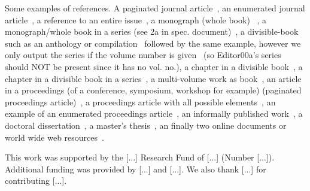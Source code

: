 \documentclass[sigconf, nonacm]{acmart}
\begin{document}
Some examples of references. A paginated journal article~\cite{Abril07}, an enumerated journal article~\cite{Cohen07}, a reference to an entire issue~\cite{JCohen96}, a monograph (whole book) ~\cite{Kosiur01}, a monograph/whole book in a series (see 2a in spec. document)~\cite{Harel79}, a divisible-book such as an anthology or compilation~\cite{Editor00} followed by the same example, however we only output the series if the volume number is given~\cite{Editor00a} (so Editor00a's series should NOT be present since it has no vol. no.), a chapter in a divisible book~\cite{Spector90}, a chapter in a divisible book in a series~\cite{Douglass98}, a multi-volume work as book~\cite{Knuth97}, an article in a proceedings (of a conference, symposium, workshop for example) (paginated proceedings article)~\cite{Andler79}, a proceedings article with all possible elements~\cite{Smith10}, an example of an enumerated proceedings article~\cite{VanGundy07}, an informally published work~\cite{Harel78}, a doctoral dissertation~\cite{Clarkson85}, a master's thesis~\cite{anisi03}, an finally two online documents or world wide web resources~\cite{Thornburg01, Ablamowicz07}.

\balance

\begin{acks}
 This work was supported by the [...] Research Fund of [...] (Number [...]). Additional funding was provided by [...] and [...]. We also thank [...] for contributing [...].
\end{acks}




\end{document}

